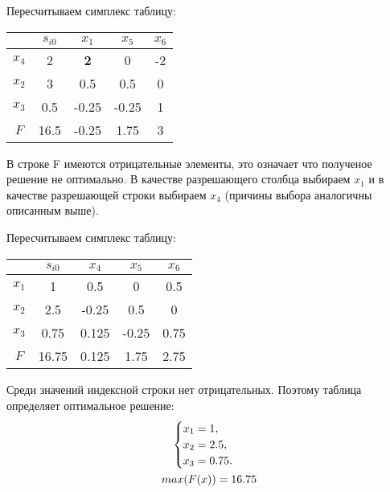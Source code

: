 \documentclass[12pt,a4paper,oneside]{extarticle}
\begin{document}
    Пересчитываем симплекс таблицу:
    \begin{center}
        \begin{tabular}{|c|c|c|c|c|}
            \hline
                 & $s_{i0}$ & $x_1$ & $x_5$ & $x_6$ \\ \hline
            $x_4$ & 2       &{\bf 2} & 0     & -2 \\ \hline
            $x_2$ & 3       & 0.5   & 0.5   & 0  \\ \hline
            $x_3$ & 0.5     & -0.25 & -0.25 & 1 \\ \hline
            $F$   & 16.5    & -0.25 & 1.75  & 3  \\ \hline
        \end{tabular}
    \end{center}

    В строке F имеются отрицательные элементы, это означает что полученое решение не оптимально.
    В качестве разрешающего столбца выбираем $x_1$ и в качестве разрешающей строки выбираем $x_4$ (причины выбора аналогичны описанным выше).

    Пересчитываем симплекс таблицу:
    \begin{center}
        \begin{tabular}{|c|c|c|c|c|}
            \hline
                 & $s_{i0}$ & $x_4$   & $x_5$   & $x_6$ \\ \hline
            $x_1$ & 1       & 0.5     & 0       & 0.5     \\ \hline
            $x_2$ & 2.5     & -0.25   & 0.5     & 0     \\ \hline
            $x_3$ & 0.75    & 0.125   & -0.25   & 0.75  \\ \hline
            $F$   & 16.75   & 0.125   & 1.75    & 2.75  \\ \hline
        \end{tabular}
    \end{center}

    Среди значений индексной строки нет отрицательных. Поэтому таблица определяет оптимальное решение:   
    \begin{gather}
        \begin{cases}
            x_1 = 1,\\
            x_2 = 2.5, \\
            x_3 = 0.75. \\
        \end{cases} \notag \\
        max (F(x)) = 16.75 \notag 
    \end{gather}
\end{document}
